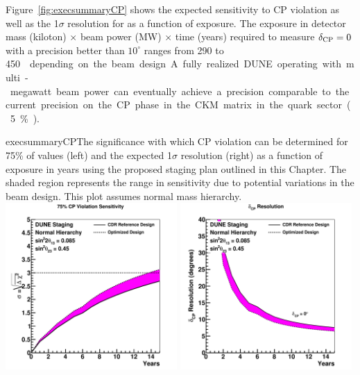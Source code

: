 Figure~\ref{fig:execsummaryCP} shows the expected sensitivity to CP
violation as well as the 1$\sigma$ resolution for \deltacp as a
function of exposure.  The exposure in detector mass (kiloton)
$\times$ beam power (MW) $\times$ time (years) required to measure
$\delta_{\rm CP} = 0 $ with a precision better than $10^\circ$ ranges
from 290 to \SI{450}\ktMWyr{} depending on the beam design.
A fully realized 
DUNE operating with multi-megawatt 
beam power can eventually achieve a precision 
comparable to the current precision on the CP phase in the
CKM matrix in the quark sector (5\%).
%
\begin{cdrfigure}{execsummaryCP}{The
    significance with which CP violation can be determined for 75\% of
    \deltacp values (left) and the expected 1$\sigma$ resolution
    (right) as a function of exposure in years using the proposed
    staging plan outlined in this Chapter. The shaded region
    represents the range in sensitivity due to potential variations in
    the beam design. This plot assumes normal mass hierarchy.}
\includegraphics[width=0.49\textwidth]{volume-physics/figures/cpv75_exp_staging15yr}
 \includegraphics[width=0.49\textwidth]{volume-physics/figures/dcp_exp_staging.pdf}
\end{cdrfigure}
